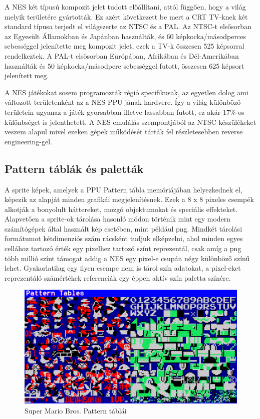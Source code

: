	A NES két típusú kompozit jelet tudott előállítani, attól függően, hogy a világ melyik területére gyártották. Ez azért következett be mert a CRT TV-knek két standard típusa terjedt el világszerte az NTSC és a PAL. Az NTSC-t elsősorban az Egyesült Államokban és Japánban használták, és 60 képkocka/másodperces sebességgel jelenítette meg kompozit jelet, ezek a TV-k összesen 525 képsorral rendelkeztek. A PAL-t elsősorban Európában, Afrikában és Dél-Amerikában használták és 50 képkocka/másodperc sebességgel futott, összesen 625 képsort jelenített meg.
	
	A NES játékokat sosem programozták régió specifikusak, az egyetlen dolog ami változott területenként az a NES PPU-jának hardvere. Így a világ különböző területein ugyanaz a játék gyorsabban illetve lassabban futott, ez akár 17\%-os különbséget is jelenthetett. A NES emulálás szempontjából az NTSC készülékeket veszem alapul mivel ezeken gépek működését tárták fel részletesebben reverse engineering-gel.
	
	\subsection{Pattern táblák és paletták}
	\label{sec:Pattern-tables-and-palettes}
	A sprite képek, amelyek a PPU Pattern tábla memóriájában helyezkednek el, képezik az alapját minden grafikái megjelenítésnek. Ezek a  8 x 8 pixeles csempék alkotják a bonyolult háttereket, mozgó objektumokat és speciális effekteket. Alapvetően a sprite-ok tárolása hasonló módon történik mint egy modern számítógépek által használt kép esetében, mint például png. Mindkét tárolási formátumot kétdimenziós szám rácsként tudjuk elképzelni, ahol minden egyes cellához tartozó érték egy pixelhez tartozó színt reprezentál, csak amíg a png több millió színt támogat addig a NES egy pixel-e csupán négy különböző színű lehet. Gyakorlatilag egy ilyen csempe nem is tárol szín adatokat, a pixel-eket reprezentáló számértékek referenciák egy éppen aktív szín paletta színére.
	
	\begin{figure}[H]
		\centering
		\includegraphics[width=150mm, keepaspectratio]{figures/Mario-Patterns}
		\caption{Super Mario Bros. Pattern táblái}
		\label{fig:Mario-Pattern}
	\end{figure}
	
